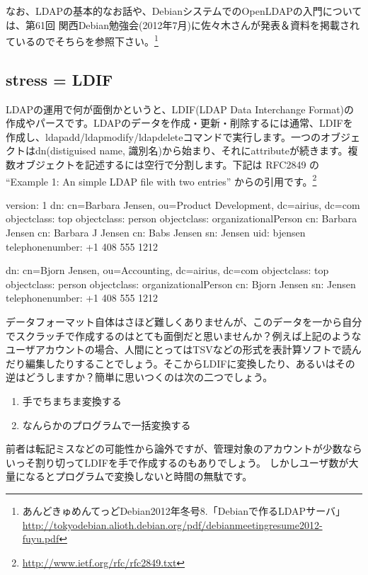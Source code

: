 \documentclass[mingoth,a4paper]{jsarticle}
\begin{document}
なお、LDAPの基本的なお話や、DebianシステムでのOpenLDAPの入門については、第61回 関西Debian勉強会(2012年7月)に佐々木さんが発表＆資料を掲載されているのでそちらを参照下さい。\footnote{あんどきゅめんてっどDebian2012年冬号8.「Debianで作るLDAPサーバ」 \url{http://tokyodebian.alioth.debian.org/pdf/debianmeetingresume2012-fuyu.pdf}}

\subsection{stress = LDIF}

LDAPの運用で何が面倒かというと、LDIF(LDAP Data Interchange Format)の作成やパースです。LDAPのデータを作成・更新・削除するには通常、LDIFを作成し、ldapadd/ldapmodify/ldapdeleteコマンドで実行します。一つのオブジェクトはdn(distiguised name, 識別名)から始まり、それにattributeが続きます。複数オブジェクトを記述するには空行で分割します。下記は RFC2849 の ``Example 1: An simple LDAP file with two entries'' からの引用です。\footnote{\url{http://www.ietf.org/rfc/rfc2849.txt}}

\begin{commandline}
version: 1
dn: cn=Barbara Jensen, ou=Product Development, dc=airius, dc=com
objectclass: top
objectclass: person
objectclass: organizationalPerson
cn: Barbara Jensen
cn: Barbara J Jensen
cn: Babs Jensen
sn: Jensen
uid: bjensen
telephonenumber: +1 408 555 1212

dn: cn=Bjorn Jensen, ou=Accounting, dc=airius, dc=com
objectclass: top
objectclass: person
objectclass: organizationalPerson
cn: Bjorn Jensen
sn: Jensen
telephonenumber: +1 408 555 1212
\end{commandline}

データフォーマット自体はさほど難しくありませんが、このデータを一から自分でスクラッチで作成するのはとても面倒だと思いませんか？例えば上記のようなユーザアカウントの場合、人間にとってはTSVなどの形式を表計算ソフトで読んだり編集したりすることでしょう。そこからLDIFに変換したり、あるいはその逆はどうしますか？簡単に思いつくのは次の二つでしょう。

\begin{enumerate}
  \item 手でちまちま変換する
  \item なんらかのプログラムで一括変換する
\end{enumerate}

前者は転記ミスなどの可能性から論外ですが、管理対象のアカウントが少数ならいっそ割り切ってLDIFを手で作成するのもありでしょう。
しかしユーザ数が大量になるとプログラムで変換しないと時間の無駄です。
\end{document}
